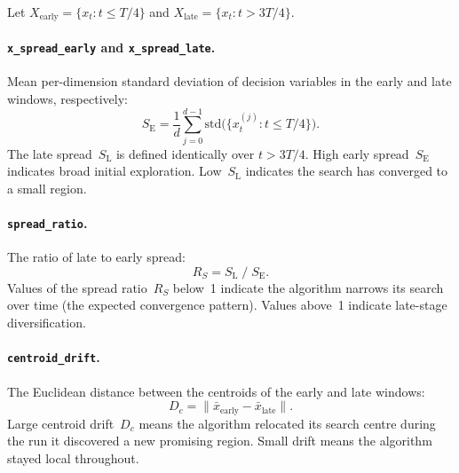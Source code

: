 Let $X_{\mathrm{early}} = \{x_t : t \le T/4\}$ and
$X_{\mathrm{late}} = \{x_t : t > 3T/4\}$.

\paragraph{\texttt{x\_spread\_early} and \texttt{x\_spread\_late}.}
Mean per-dimension standard deviation of decision variables in the early and
late windows, respectively:
\begin{equation}
\label{eq:spread}
  S_{\mathrm{E}}
    = \frac{1}{d}\sum_{j=0}^{d-1}
      \mathrm{std}\!\bigl(\{x_t^{(j)} : t \le T/4\}\bigr).
\end{equation}
The late spread~$S_{\mathrm{L}}$ is defined identically over $t > 3T/4$.
High early spread~$S_{\mathrm{E}}$ indicates broad initial exploration.
Low~$S_{\mathrm{L}}$ indicates the search has converged to a small
region.

\paragraph{\texttt{spread\_ratio}.}
The ratio of late to early spread:
\begin{equation}
\label{eq:spread_ratio}
  R_S = S_{\mathrm{L}} \;/\; S_{\mathrm{E}}.
\end{equation}
Values of the spread ratio~$R_S$ below~1 indicate the algorithm narrows
its search over time (the expected convergence pattern). Values above~1
indicate late-stage diversification.

\paragraph{\texttt{centroid\_drift}.}
The Euclidean distance between the centroids of the early and late windows:
\begin{equation}
\label{eq:centroid}
  D_c
    = \bigl\lVert \bar{x}_{\mathrm{early}}
      - \bar{x}_{\mathrm{late}} \bigr\rVert.
\end{equation}
Large centroid drift~$D_c$ means the algorithm relocated its search
centre during the run it discovered a new promising region.  Small drift means the algorithm stayed
local throughout.

